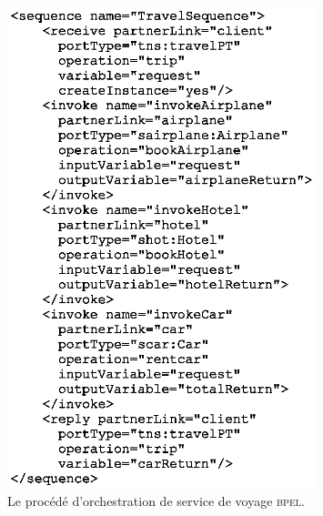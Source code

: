 \begin{figure}[h]
    \centering
    \includegraphics[width=0.8\textwidth]{figs/bpel_travel_example_document.eps}
    \caption{Le procédé d'orchestration de service de voyage \textsc{bpel}.}
    \label{fig:bpel_travel_example_document}
\end{figure}
